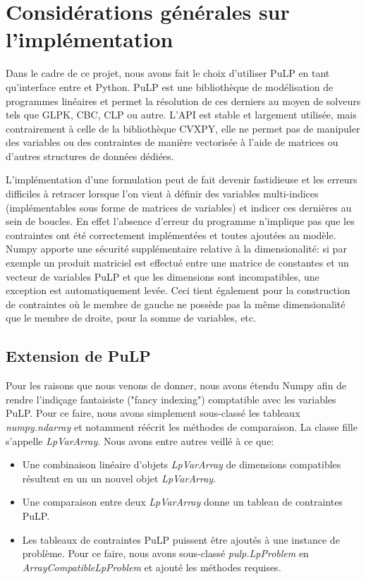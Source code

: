 \chapter{Considérations générales sur l'implémentation}
\vspace*{1.2cm}

Dans le cadre de ce projet, nous avons fait le choix d'utiliser PuLP \citep{mitchell2011pulp} en tant qu'interface entre
\solver et Python. PuLP est une bibliothèque de modélisation de programmes linéaires et permet
la résolution de ces derniers au moyen de solveurs tels que GLPK, CBC, CLP ou autre.
L'API est stable et largement utilisée, mais contrairement à celle de la bibliothèque CVXPY,
elle ne permet pas de manipuler des variables ou des contraintes de manière vectorisée à l'aide
de matrices ou d'autres structures de données dédiées.

L'implémentation d'une formulation peut de fait devenir fastidieuse et les erreurs difficiles à
retracer lorsque l'on vient à définir des variables multi-indices (implémentables sous forme
de matrices de variables) et indicer ces dernières au sein de boucles. En effet l'absence d'erreur du programme
n'implique pas que les contraintes ont été correctement implémentées et toutes ajoutées au modèle.
Numpy apporte une sécurité supplémentaire relative à la dimensionalité: si par exemple un produit matriciel est effectué
entre une matrice de constantes et un vecteur de variables PuLP et que les dimensions sont incompatibles,
une exception est automatiquement levée. Ceci tient également pour la construction de contraintes où le membre de gauche ne possède pas
la même dimensionalité que le membre de droite, pour la somme de variables, etc.

\section{Extension de PuLP}

Pour les raisons que nous venons de donner, nous avons étendu Numpy afin de rendre l'indiçage 
fantaisiste ("fancy indexing") comptatible avec les variables PuLP. Pour ce faire, nous avons
simplement sous-classé les tableaux \textit{numpy.ndarray} et notamment réécrit les méthodes de comparaison.
La classe fille s'appelle \textit{LpVarArray}. Nous avons entre autres veillé à ce que:
\begin{itemize}
  \item Une combinaison linéaire d'objets \textit{LpVarArray} de dimensions compatibles résultent en un
  un nouvel objet \textit{LpVarArray}.
  \item Une comparaison entre deux \textit{LpVarArray} donne un tableau de contraintes PuLP.
  \item Les tableaux de contraintes PuLP puissent être ajoutés à une instance de problème.
  Pour ce faire, nous avons sous-classé \textit{pulp.LpProblem} en \textit{ArrayCompatibleLpProblem}
  et ajouté les méthodes requises.
\end{itemize}

